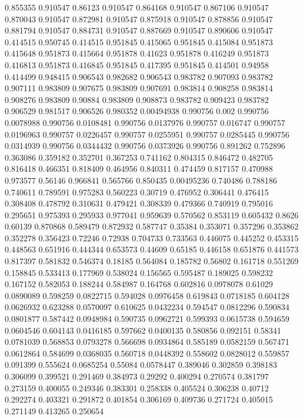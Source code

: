 0.855355 0.910547
0.86123 0.910547
0.864168 0.910547
0.867106 0.910547
0.870043 0.910547
0.872981 0.910547
0.875918 0.910547
0.878856 0.910547
0.881794 0.910547
0.884731 0.910547
0.887669 0.910547
0.890606 0.910547
0.414515 0.950745
0.414515 0.951845
0.415065 0.951845
0.415084 0.951873
0.415648 0.951873
0.415664 0.951878
0.41623 0.951878
0.416249 0.951873
0.416813 0.951873
0.416845 0.951845
0.417395 0.951845
0.414501 0.94958
0.414499 0.948415
0.906543 0.982682
0.906543 0.983782
0.907093 0.983782
0.907111 0.983809
0.907675 0.983809
0.907691 0.983814
0.908258 0.983814
0.908276 0.983809
0.90884 0.983809
0.908873 0.983782
0.909423 0.983782
0.906529 0.981517
0.906526 0.980352
0.00494938 0.990756
0.002 0.990756
0.0078988 0.990756
0.0108481 0.990756
0.0137976 0.990757
0.016747 0.990757
0.0196963 0.990757
0.0226457 0.990757
0.0255951 0.990757
0.0285445 0.990756
0.0314939 0.990756
0.0344432 0.990756
0.0373926 0.990756
0.891262 0.752896
0.363086 0.359182
0.352701 0.367253
0.741162 0.804315
0.846472 0.482705
0.816418 0.466351
0.818409 0.464956
0.840311 0.474459
0.817157 0.470988
0.973577 0.56146
0.966841 0.565766
0.850435 0.00495236
0.740486 0.788186
0.740611 0.789591
0.975283 0.560223
0.30719 0.476952
0.306441 0.476415
0.308408 0.478792
0.310631 0.479421
0.308339 0.479366
0.740919 0.795016
0.295651 0.975393
0.295933 0.977041
0.959639 0.570562
0.853119 0.605432
0.8626 0.60139
0.870868 0.589479
0.872932 0.587747
0.35384 0.353071
0.357296 0.353862
0.352278 0.356423
0.72246 0.72938
0.704733 0.733563
0.446075 0.445252
0.453315 0.448563
0.651916 0.444344
0.653573 0.44609
0.65185 0.446158
0.651876 0.441573
0.817397 0.581832
0.546374 0.18185
0.564084 0.185782
0.56802 0.161718
0.551269 0.158845
0.533413 0.177969
0.538024 0.156565
0.595487 0.189025
0.598232 0.167152
0.582053 0.188244
0.584987 0.164768
0.602816 0.0978078
0.61029 0.0890089
0.598259 0.0822715
0.594028 0.0976458
0.619843 0.0718185
0.604128 0.0626932
0.623288 0.0570097
0.610625 0.0432234
0.594547 0.0812296
0.590834 0.0801877
0.587442 0.0948984
0.590735 0.0962721
0.599393 0.0615738
0.594659 0.0604546
0.604143 0.0416185
0.597662 0.0400135
0.580856 0.092151
0.58341 0.0781039
0.568853 0.0793278
0.566698 0.0934864
0.585189 0.0582159
0.567471 0.0612864
0.584699 0.0368035
0.560718 0.0448392
0.558602 0.0828012
0.559857 0.091399
0.555624 0.0685254
0.55084 0.0578447
0.389046 0.302859
0.398183 0.306099
0.399521 0.291469
0.384973 0.29292
0.400294 0.270574
0.381797 0.273159
0.400055 0.249346
0.383301 0.258338
0.405524 0.306238
0.40712 0.292274
0.403321 0.291872
0.401854 0.306169
0.409736 0.271724
0.405015 0.271149
0.413265 0.250654
